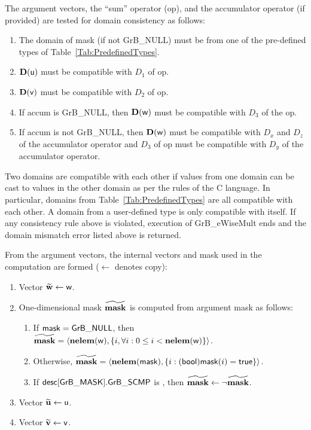 The argument vectors, the ``sum'' operator ({\sf op}), and the accumulator 
operator (if provided) are tested for domain consistency as follows:
\begin{enumerate}
	\item The domain of {\sf mask} (if not {\sf GrB\_NULL}) must be from one of the pre-defined types of Table~\ref{Tab:PredefinedTypes}.

	\item $\bold{D}({\sf u})$ must be compatible with $D_1$ of {\sf op}.

	\item $\bold{D}({\sf v})$ must be compatible with $D_2$ of {\sf op}.

	\item If {\sf accum} is {\sf GrB\_NULL}, then $\bold{D}({\sf w})$ must be 
    compatible with $D_3$ of the {\sf op}.

	\item If {\sf accum} is not {\sf GrB\_NULL}, then $\bold{D}({\sf w})$ must be
    compatible with $D_x$ and $D_z$ of the accumulator operator and $D_3$ of
    {\sf op} must be compatible with $D_y$ of the accumulator operator.
\end{enumerate}
Two domains are compatible with each other if values from one domain can be cast 
to values in the other domain as per the rules of the C language.
In particular, domains from Table~\ref{Tab:PredefinedTypes} are all compatible 
with each other. A domain from a user-defined type is only compatible with itself.
If any consistency rule above is violated, execution of {\sf GrB\_eWiseMult} ends
and the domain mismatch error listed above is returned.

From the argument vectors, the internal vectors and mask used in 
the computation are formed ($\leftarrow$ denotes copy):
\begin{enumerate}
	\item Vector ${\bf \widetilde{w}} \leftarrow {\sf w}$.

	\item One-dimensional mask ${\bf \widetilde{mask}}$ is computed from 
    argument {\sf mask} as follows:
	\begin{enumerate}
		\item	If ${\sf mask} = {\sf GrB\_NULL}$, then ${\bf \widetilde{mask}} = 
        \langle \bold{nelem}({\sf w}), \{i, \forall i : 0 \leq i < 
        \bold{nelem}({\sf w}) \} \rangle$.

		\item	Otherwise, ${\bf \widetilde{mask}} = 
        \langle \bold{nelem}({\sf mask}), \{i : ({\sf bool}){\sf mask}(i) = 
        {\sf true}\} \rangle$.

		\item	If ${\sf desc[GrB\_MASK].GrB\_SCMP}$ is \true, then ${\bf \widetilde{mask}} \leftarrow \neg {\bf \widetilde{mask}}$.
	\end{enumerate}

	\item Vector ${\bf \widetilde{u}} \leftarrow {\sf u}$.

	\item Vector ${\bf \widetilde{v}} \leftarrow {\sf v}$.
\end{enumerate}


